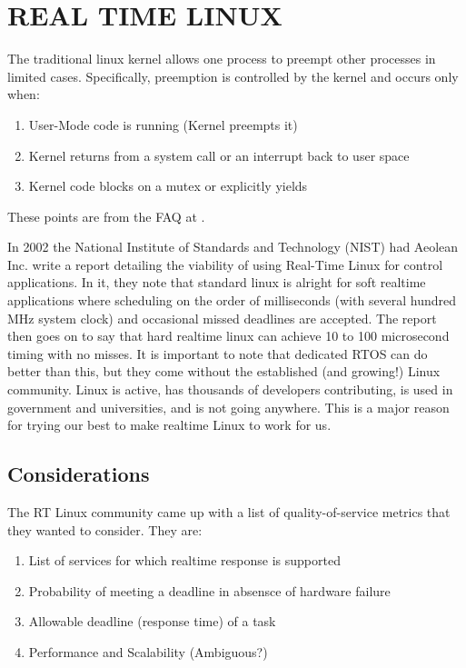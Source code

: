 \documentclass{article}
\begin{document}
\section{REAL TIME LINUX}
The traditional linux kernel allows one process to preempt other processes in limited cases.  Specifically, preemption is controlled by the kernel and occurs only when:

\begin{enumerate}
\item User-Mode code is running (Kernel preempts it)
\item Kernel returns from a system call or an interrupt back to user space
\item Kernel code blocks on a mutex or explicitly yields
\end{enumerate}
These points are from the FAQ at \cite{RealTimeLinux}.

In 2002 the National Institute of Standards and Technology (NIST) had Aeolean Inc. write a report detailing the viability of using Real-Time Linux for control applications. \cite{IntroLinuxForRealTime}  In it, they note that standard linux is alright for soft realtime applications where scheduling on the order of milliseconds (with several hundred MHz system clock) and occasional missed deadlines are accepted.  The report then goes on to say that hard realtime linux can achieve 10 to 100 microsecond timing with no misses.  It is important to note that dedicated RTOS can do better than this, but they come without the established (and growing!) Linux community.  Linux is active, has thousands of developers contributing, is used in government and universities, and is not going anywhere.  This is a major reason for trying our best to make realtime Linux to work for us.

\subsection{Considerations}
The RT Linux community came up with a list of quality-of-service metrics that they wanted to consider. \cite{RTLSummaryPost}  They are:
\begin{enumerate}
\item List of services for which realtime response is supported
\item Probability of meeting a deadline in absensce of hardware failure
\item Allowable deadline (response time) of a task
\item Performance and Scalability (Ambiguous?)
\end{enumerate}
\end{document}
